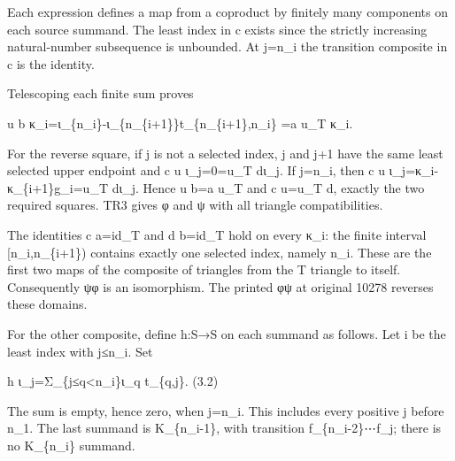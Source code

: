 Each expression defines a map from a coproduct by finitely many components on each source summand. The least index in c exists since the strictly increasing natural-number subsequence is unbounded. At j\allowbreak{}=n\_\allowbreak{}i the transition composite in c is the identity.

Telescoping each finite sum proves

u b κ\_\allowbreak{}i\allowbreak{}=ι\_\allowbreak{}\{n\_\allowbreak{}i\}-ι\_\allowbreak{}\{n\_\allowbreak{}\{i\allowbreak{}+1\}\}t\_\allowbreak{}\{n\_\allowbreak{}\{i\allowbreak{}+1\},\allowbreak{}n\_\allowbreak{}i\} \allowbreak{}=a u\_\allowbreak{}T κ\_\allowbreak{}i.

For the reverse square,\allowbreak{} if j is not a selected index,\allowbreak{} j and j\allowbreak{}+1 have the same least selected upper endpoint and c u ι\_\allowbreak{}j\allowbreak{}=0\allowbreak{}=u\_\allowbreak{}T dι\_\allowbreak{}j. If j\allowbreak{}=n\_\allowbreak{}i,\allowbreak{} then c u ι\_\allowbreak{}j\allowbreak{}=κ\_\allowbreak{}i-κ\_\allowbreak{}\{i\allowbreak{}+1\}g\_\allowbreak{}i\allowbreak{}=u\_\allowbreak{}T dι\_\allowbreak{}j. Hence u b\allowbreak{}=a u\_\allowbreak{}T and c u\allowbreak{}=u\_\allowbreak{}T d,\allowbreak{} exactly the two required squares. TR3 gives φ and ψ with all triangle compatibilities.

The identities c a\allowbreak{}=id\_\allowbreak{}T and d b\allowbreak{}=id\_\allowbreak{}T hold on every κ\_\allowbreak{}i:\allowbreak{} the finite interval [n\_\allowbreak{}i,\allowbreak{}n\_\allowbreak{}\{i\allowbreak{}+1\})\allowbreak{} contains exactly one selected index,\allowbreak{} namely n\_\allowbreak{}i. These are the first two maps of the composite of triangles from the T triangle to itself. Consequently ψφ is an isomorphism. The printed φψ at original 10278 reverses these domains.

For the other composite,\allowbreak{} define h:\allowbreak{}S\allowbreak{}→S on each summand as follows. Let i be the least index with j≤n\_\allowbreak{}i. Set

h ι\_\allowbreak{}j\allowbreak{}=Σ\_\allowbreak{}\{j≤q<n\_\allowbreak{}i\}ι\_\allowbreak{}q t\_\allowbreak{}\{q,\allowbreak{}j\}. (3.2)\allowbreak{}

The sum is empty,\allowbreak{} hence zero,\allowbreak{} when j\allowbreak{}=n\_\allowbreak{}i. This includes every positive j before n\_\allowbreak{}1. The last summand is K\_\allowbreak{}\{n\_\allowbreak{}i-1\},\allowbreak{} with transition f\_\allowbreak{}\{n\_\allowbreak{}i-2\}⋯f\_\allowbreak{}j; there is no K\_\allowbreak{}\{n\_\allowbreak{}i\} summand.

